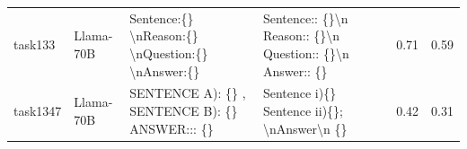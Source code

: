 \begin{longtable}{@{}p{0.8cm\tiny}p{1cm\tiny}p{4.1cm\ttfamily\tiny}p{4.1cm\ttfamily\tiny}p{0.8cm\tiny}p{0.8cm\tiny}@{}}
task133   & Llama-70B  & Sentence:\{\} \textbackslash{}nReason:\{\} \textbackslash{}nQuestion:\{\} \textbackslash{}nAnswer:\{\}                                                                                                                                                                                                                                                                                                                                                                                                                  & Sentence:: \{\}\textbackslash{}n Reason:: \{\}\textbackslash{}n Question:: \{\}\textbackslash{}n Answer:: \{\}                                                                                                                                                                                                                                                                                                                                                                                                                                                                    & 0.71 & 0.59 \\
task1347  & Llama-70B  & SENTENCE A): \{\} ,  SENTENCE B): \{\} ANSWER::: \{\}                                                                                                                                                                                                                                                                                                                                                                                                                                                                   & Sentence i)\{\} Sentence ii)\{\}; \textbackslash{}nAnswer\textbackslash{}n \{\}                                                                                                                                                                                                                                                                                                                                                                                                                                                                                                   & 0.42 & 0.31 \\

\end{longtable}

